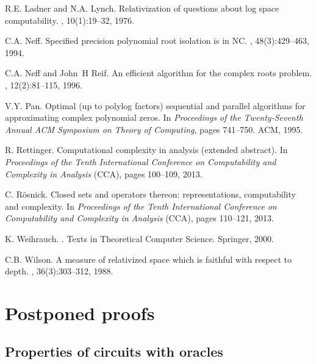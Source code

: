 \documentclass[a4paper,UKenglish]{lipics}
\begin{document}
\begin{thebibliography}{10}
R.E. Ladner and N.A. Lynch.
\newblock Relativization of questions about log space computability.
, 10(1):19--32, 1976.

C.A. Neff.
\newblock Specified precision polynomial root isolation is in $\mathrm{NC}$.
, 48(3):429--463, 1994.

C.A. Neff and John~H Reif.
\newblock An efficient algorithm for the complex roots problem.
, 12(2):81--115, 1996.

V.Y. Pan.
\newblock Optimal (up to polylog factors) sequential and parallel algorithms
  for approximating complex polynomial zeros.
\newblock In {\em Proceedings of the Twenty-Seventh Annual ACM Symposium on
  Theory of Computing}, pages 741--750. ACM, 1995.

R. Rettinger. 
\newblock Computational complexity in analysis (extended abstract). 
\newblock In \emph{Proceedings of the Tenth International Conference on Computability and Complexity in Analysis} (CCA), pages 100--109, 2013.

C. R\"osnick. 
\newblock Closed sets and operators thereon: representations, computability and complexity. 
\newblock In \emph{Proceedings of the Tenth International Conference on Computability and Complexity in Analysis} (CCA), pages 110--121, 2013.

K. Weihrauch.
.
\newblock Texts in Theoretical Computer Science. Springer, 2000.

C.B. Wilson.
\newblock A measure of relativized space which is faithful with respect to
  depth.
, 36(3):303--312, 1988.

\end{thebibliography}

\clearpage
\appendix
\section{Postponed proofs}

\subsection{Properties of circuits with oracles}
\end{document}
